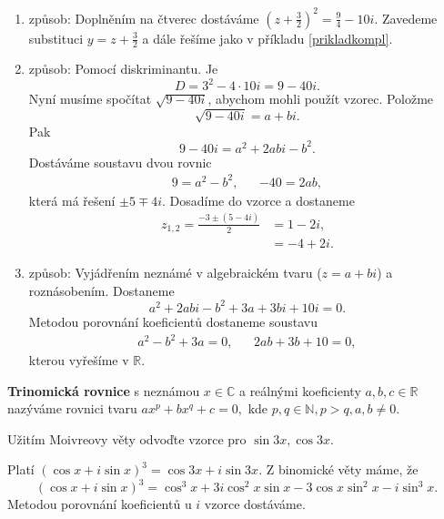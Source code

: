 \begin{reseni}
\begin{enumerate}[1.]
\item způsob: Doplněním na čtverec dostáváme $\left ( z+\frac{3}{2} \right )^2=\frac{9}{4}-10i. $
Zavedeme substituci $y=z + \frac{3}{2}$ a dále řešíme jako v příkladu \ref{prikladkompl}.
\item způsob: Pomocí diskriminantu. Je
$$
    D = 3^2 - 4 \cdot 10i = 9 - 40i.
$$
Nyní musíme spočítat $\sqrt{9-40i}$, abychom mohli použít vzorec. Položme
$$
\sqrt{9-40i} = a+bi.
$$
Pak
$$
9-40 i = a^2 + 2abi - b^2.
$$
Dostáváme soustavu dvou rovnic
\begin{align*}
	9 = a^2 - b^2, && -40 = 2ab,
\end{align*}
která má řešení $\pm 5 \mp 4i$. Dosadíme do vzorce a dostaneme
\begin{align*}
z_{1,2} = \frac{-3 \pm (5-4i)}{2} &= 1-2i,\\
&= -4+2i.
\end{align*}
\item způsob: Vyjádřením neznámé v algebraickém tvaru ($z=a+bi$) a roznásobením. Dostaneme
$$
    a^2 + 2abi -b^2 + 3a + 3bi + 10 i = 0.
$$
Metodou porovnání koeficientů dostaneme soustavu
\begin{align*}
	a^2 - b^2 + 3a =0, && 2ab + 3b+10 = 0,
\end{align*}
kterou vyřešíme v $\mathbb R $.
\end{enumerate}
\end{reseni}

\begin{definition}
\textbf{Trinomická rovnice} s neznámou $x\in \mathbb C$ a reálnými koeficienty $a,b,c \in \mathbb R$
nazýváme rovnici tvaru $ax^p + bx^q + c = 0,$ kde $p,q\in \mathbb N, p>q, a,b\ne 0.$
\end{definition}

\begin{priklad}
Užitím Moivreovy věty odvoďte vzorce pro $\sin 3x, \cos 3x.$
\end{priklad}

\begin{reseni}
Platí $(\cos x + i\sin x)^3=\cos 3x+i\sin 3x.$ Z binomické věty máme, že
$$(\cos x+i\sin x)^3=\cos^3 x + 3i\cos^2 x\sin x - 3\cos x\sin^2 x-i\sin^3 x.$$
Metodou porovnání koeficientů u $i$ vzorce dostáváme.
\end{reseni}
